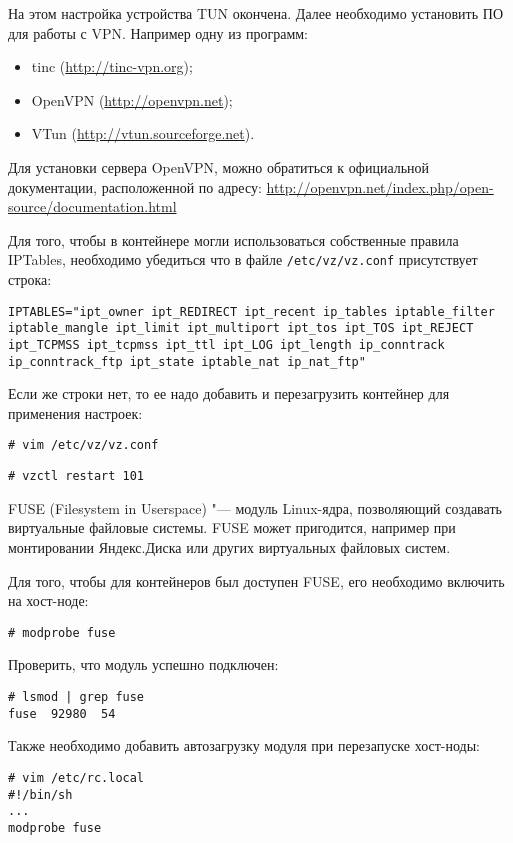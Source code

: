 На этом настройка устройства TUN окончена.
Далее необходимо установить ПО для работы с VPN.
Например одну из программ:
\begin{itemize}
    \item tinc (\url{http://tinc-vpn.org});
    \item OpenVPN (\url{http://openvpn.net});
    \item VTun (\url{http://vtun.sourceforge.net}).
\end{itemize}

Для установки сервера OpenVPN, можно обратиться к официальной документации, расположенной по адресу: \url{http://openvpn.net/index.php/open-source/documentation.html}

Для того, чтобы в контейнере могли использоваться собственные правила IPTables, необходимо убедиться что в файле \texttt{/etc/vz/vz.conf} присутствует строка:
\begin{lstlisting}
IPTABLES="ipt_owner ipt_REDIRECT ipt_recent ip_tables iptable_filter iptable_mangle ipt_limit ipt_multiport ipt_tos ipt_TOS ipt_REJECT ipt_TCPMSS ipt_tcpmss ipt_ttl ipt_LOG ipt_length ip_conntrack ip_conntrack_ftp ipt_state iptable_nat ip_nat_ftp"
\end{lstlisting}

Если же строки нет, то ее надо добавить и перезагрузить контейнер для применения настроек:
\begin{lstlisting}
# vim /etc/vz/vz.conf
\end{lstlisting}
\begin{lstlisting}
# vzctl restart 101
\end{lstlisting}

FUSE (Filesystem in Userspace) "--- модуль Linux-ядра, позволяющий создавать виртуальные файловые системы.
FUSE может пригодится, например при монтировании Яндекс.Диска или других виртуальных файловых систем.

Для того, чтобы для контейнеров был доступен FUSE, его необходимо включить на хост-ноде:
\begin{lstlisting}
# modprobe fuse
\end{lstlisting}

Проверить, что модуль успешно подключен:
\begin{lstlisting}
# lsmod | grep fuse
fuse  92980  54
\end{lstlisting}

Также необходимо добавить автозагрузку модуля при перезапуске хост-ноды:
\begin{lstlisting}
# vim /etc/rc.local
#!/bin/sh
...
modprobe fuse
\end{lstlisting}

